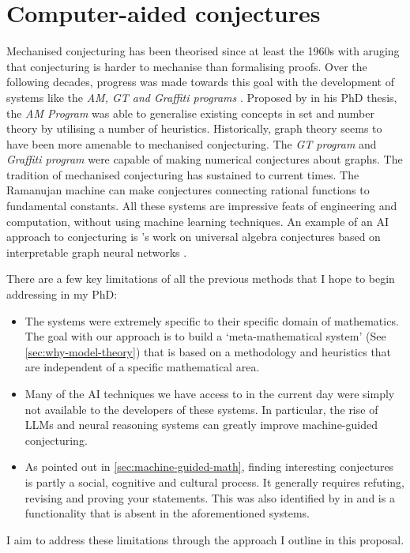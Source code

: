 \section{Computer-aided conjectures}
\label{sec:comp-conjecturing}
Mechanised conjecturing has been theorised since at least the 1960s \cite{mechMath1960} with \citeauthor{mechMath1960} aruging that conjecturing is harder to mechanise than formalising proofs. Over the following decades, progress was made towards this goal with the development of systems like the \textit{AM, GT and Graffiti programs} \cite{lenat1976am, epsteinLearningDiscoveryOne1988, fajtlowicz1988conjectures}. Proposed by \citeauthor{lenat1976am} in his PhD thesis, the \textit{AM Program} was able to generalise existing concepts in set and number theory by utilising a number of heuristics.  
Historically, graph theory seems to have been more amenable to mechanised conjecturing. The \textit{GT program} and \textit{Graffiti program} were capable of making numerical conjectures about graphs. The tradition of mechanised conjecturing has sustained to current times. The Ramanujan machine \cite{raayoniGeneratingConjecturesFundamental2021} can make conjectures connecting rational functions to fundamental constants. All these systems are impressive feats of engineering and computation, without using machine learning techniques.
An example of an AI approach to conjecturing is \citeauthor{gianniniInterpretableGraphNetworks2023}'s work on universal algebra conjectures based on interpretable graph neural networks \cite{gianniniInterpretableGraphNetworks2023}.
\par
There are a few key limitations of all the previous methods that I hope to begin addressing in my PhD:
\begin{itemize}
    \label{list:comp-conj}
    \item The systems were extremely specific to their specific domain of mathematics. The goal with our approach is to build a `meta-mathematical system' (See \ref{sec:why-model-theory}) that is based on a methodology and heuristics that are independent of a specific mathematical area.
    \item Many of the AI techniques we have access to in the current day were simply not available to the developers of these systems. In particular, the rise of LLMs and neural reasoning systems can greatly improve machine-guided conjecturing.
    \item As pointed out in \ref{sec:machine-guided-math}, finding interesting conjectures is partly a social, cognitive and cultural process. It generally requires refuting, revising and proving your statements. This was also identified by \citeauthor{jiangLearningPlausibleUseful} in \cite{jiangLearningPlausibleUseful} and is a functionality that is absent in the aforementioned systems.
\end{itemize}
I aim to address these limitations through the approach I outline in this proposal.

